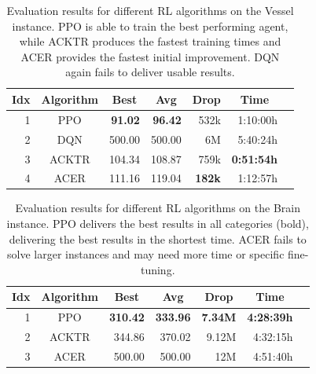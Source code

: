 \begin{table}[htp]
    \begin{center}
        \begin{tabular}{rcrrrrr}
            \toprule
            \multicolumn{1}{c}{Idx} & \multicolumn{1}{c}{Algorithm} & \multicolumn{1}{c}{Best} & \multicolumn{1}{c}{Avg} & \multicolumn{1}{c}{Drop} & \multicolumn{1}{c}{Time}\\
            \midrule
            1 & PPO & \textbf{91.02} & \textbf{96.42} & 532k & 1:10:00h \\
            2 & DQN & 500.00 & 500.00 & 6M & 5:40:24h \\
            3 & ACKTR & 104.34 & 108.87 & 759k & \textbf{0:51:54h} \\
            4 & ACER & 111.16 & 119.04 & \textbf{182k} & 1:12:57h \\
            \bottomrule
        \end{tabular}
    \end{center}
    \caption[Evaluation of RL Algorithms on the Vessel Instance]{Evaluation results for different RL algorithms on the Vessel instance. PPO is able to train the best performing agent, while ACKTR produces the fastest training times and ACER provides the fastest initial improvement. DQN again fails to deliver usable results.} \label{tab:AlgorithmEval/VesselMaze02}
\end{table}

\begin{table}[htp]
    \begin{center}
        \begin{tabular}{rcrrrrr}
            \toprule
            \multicolumn{1}{c}{Idx} & \multicolumn{1}{c}{Algorithm} & \multicolumn{1}{c}{Best} & \multicolumn{1}{c}{Avg} & \multicolumn{1}{c}{Drop} &  \multicolumn{1}{c}{Time}\\
            \midrule
            1 & PPO & \textbf{310.42} & \textbf{333.96} & \textbf{7.34M} & \textbf{4:28:39h} \\
            2 & ACKTR & 344.86 & 370.02 & 9.12M & 4:32:15h \\
            3 & ACER & 500.00 & 500.00 & 12M & 4:51:40h \\
            \bottomrule
        \end{tabular}
    \end{center}
    \caption{Evaluation results for different RL algorithms on the Brain instance. PPO delivers the best results in all categories (bold), delivering the best results in the shortest time. ACER fails to solve larger instances and may need more time or specific fine-tuning.} \label{tab:AlgorithmEval/Maze0122}
\end{table}

